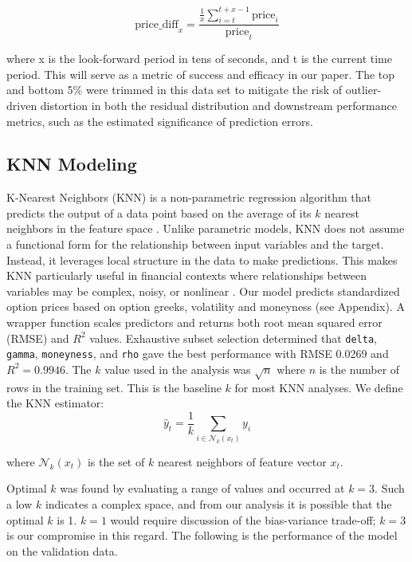 \documentclass{article}
\begin{document}
\[
\text{price\_diff}_x = \frac{\frac{1}{x}\sum_{i=t}^{t+x-1}\text{price}_i}{\text{price}_t}
\]

where x is the look-forward period in tens of seconds, and t is the current time period. This will serve as a metric of success and efficacy in our paper. The top and bottom 5\% were trimmed in this data set to mitigate the risk of outlier-driven distortion in both the residual distribution and downstream performance metrics, such as the estimated significance of prediction errors.

\subsection{KNN Modeling}

K-Nearest Neighbors (KNN) is a non-parametric regression algorithm that predicts the output of a data point based on the average of its $k$ nearest neighbors in the feature space \cite{cover1967nearest}. Unlike parametric models, KNN does not assume a functional form for the relationship between input variables and the target. Instead, it leverages local structure in the data to make predictions. This makes KNN particularly useful in financial contexts where relationships between variables may be complex, noisy, or nonlinear \cite{altman1992introduction}. Our model predicts standardized option prices based on option greeks, volatility and moneyness (see Appendix). A wrapper function scales predictors and returns both root mean squared error (RMSE) and $R^2$ values. Exhaustive subset selection determined that \verb|delta|, \verb|gamma|, \verb|moneyness|, and \verb|rho| gave the best performance with RMSE 0.0269 and \( R^2 = 0.9946 \). The $k$ value used in the analysis was $\sqrt{n}$ where $n$ is the number of rows in the training set. This is the baseline $k$ for most KNN analyses. We define the KNN estimator:
\[
\hat{y}_t = \frac{1}{k} \sum_{i \in \mathcal{N}_k(x_t)} y_i
\]

where \( \mathcal{N}_k(x_t) \) is the set of \( k \) nearest neighbors of feature vector \( x_t \). \

Optimal $k$ was found by evaluating a range of values and occurred at $k=3$. Such a low $k$ indicates a complex space, and from our analysis it is possible that the optimal $k$ is 1. $k=1$ would require discussion of the bias-variance trade-off; $k=3$ is our compromise in this regard. The following is the performance of the model on the validation data.
\end{document}
